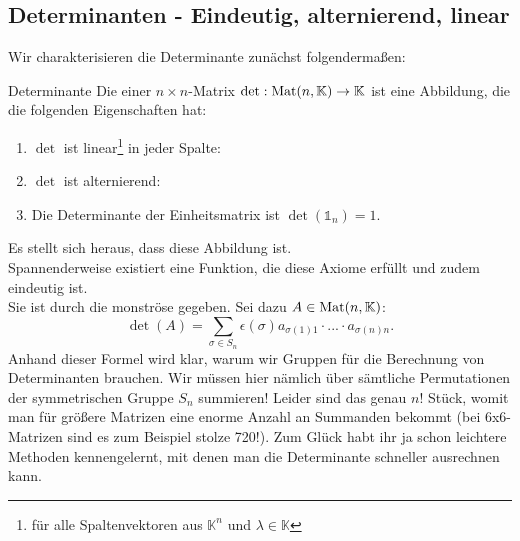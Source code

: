\subsection{Determinanten - Eindeutig, alternierend, linear}\label{ssec:Determinante}
Wir charakterisieren die Determinante zunächst folgendermaßen:
\begin{Def}
{Determinante}
Die  einer $n\times n$-Matrix $\det:\text{Mat}(n,\mathbb{K})\to\mathbb{K}$ ist eine Abbildung, die die folgenden Eigenschaften hat:
\begin{enumerate}
    \item $\det$ ist linear\footnote{für alle Spaltenvektoren aus $\mathbb{K}^n$ und $\lambda\in\mathbb{K}$} in jeder Spalte:
    \item $\det$ ist alternierend:\\
    \item Die Determinante der Einheitsmatrix ist $\det(\mathds{1}_n)=1$.
\end{enumerate}
Es stellt sich heraus, dass diese Abbildung  ist.\\
Spannenderweise existiert eine Funktion, die diese Axiome erfüllt und zudem eindeutig ist.\\
Sie ist durch die monströse  gegeben. Sei dazu $A\in \text{Mat} (n, \mathbb{K})$:
\begin{equation*}
    \det (A) = \sum_{\sigma \in S_{n}} \epsilon (\sigma) a_{\sigma(1)1}\cdot ... \cdot a_{\sigma(n)n}.
\end{equation*}
Anhand dieser Formel wird klar, warum wir Gruppen für die Berechnung von Determinanten brauchen. Wir müssen hier nämlich über sämtliche Permutationen der symmetrischen Gruppe $S_{n}$ summieren! Leider sind das genau $n!$ Stück, womit man für größere Matrizen eine enorme Anzahl an Summanden bekommt (bei 6x6-Matrizen sind es zum Beispiel stolze 720!). Zum Glück habt ihr ja schon leichtere Methoden kennengelernt, mit denen man die Determinante schneller ausrechnen kann.
\end{Def}
